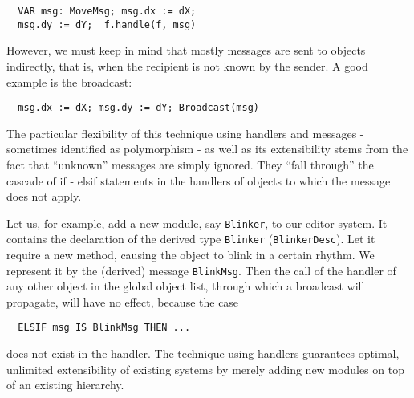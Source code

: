 \begin{verbatim}
  VAR msg: MoveMsg; msg.dx := dX;
  msg.dy := dY;  f.handle(f, msg)
\end{verbatim}
However, we must keep in mind that mostly messages are sent to objects indirectly, that is, when the
recipient is not known by the sender. A good example is the broadcast:
\begin{verbatim}
  msg.dx := dX; msg.dy := dY; Broadcast(msg)
\end{verbatim}
The particular flexibility of this technique using handlers and messages - sometimes identified as
polymorphism - as well as its extensibility stems from the fact that “unknown” messages are simply
ignored. They “fall through” the cascade of if - elsif statements in the handlers of objects to which
the message does not apply.

Let us, for example, add a new module, say \verb|Blinker|, to our editor system. It contains the declaration
of the derived type \verb|Blinker| (\verb|BlinkerDesc|). Let it require a new method, causing the object to
blink in a certain rhythm. We represent it by the (derived) message \verb|BlinkMsg|. Then the call of the
handler of any other object in the global object list, through which a broadcast will propagate, will have
no effect, because the case
\begin{verbatim}
  ELSIF msg IS BlinkMsg THEN ...
\end{verbatim}
does not exist in the handler. The technique using handlers guarantees optimal, unlimited extensibility of
existing systems by merely adding new modules on top of an existing hierarchy.

